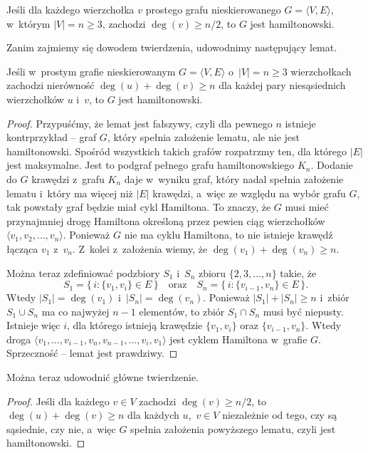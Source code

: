 \subproblem %
\begin{twierdzenie}[Dirac]
	Jeśli dla każdego wierzchołka $v$ prostego grafu nieskierowanego $G=\langle V,E\rangle$, w~którym $|V|=n\ge3$, zachodzi $\deg(v)\ge n/2$, to $G$ jest hamiltonowski.
\end{twierdzenie}
Zanim zajmiemy się dowodem twierdzenia, udowodnimy następujący lemat.
\begin{lemat}[Ore]
	Jeśli w~prostym grafie nieskierowanym $G=\langle V,E\rangle$ o~$|V|=n\ge3$ wierzchołkach zachodzi nierówność $\deg(u)+\deg(v)\ge n$ dla każdej pary niesąsiednich wierzchołków $u$ i~$v$, to $G$ jest hamiltonowski.
\end{lemat}
\begin{proof}
Przypuśćmy, że lemat jest fałszywy, czyli dla pewnego $n$ istnieje kontrprzykład -- graf $G$, który spełnia założenie lematu, ale nie jest hamiltonowski. Spośród wszystkich takich grafów rozpatrzmy ten, dla którego $|E|$ jest maksymalne. Jest to podgraf pełnego grafu hamiltonowskiego $K_n$. Dodanie do $G$ krawędzi z~grafu $K_n$ daje w~wyniku graf, który nadal spełnia założenie lematu i~który ma więcej niż $|E|$ krawędzi, a~więc ze względu na wybór grafu $G$, tak powstały graf będzie miał cykl Hamiltona. To znaczy, że $G$ musi mieć przynajmniej drogę Hamiltona określoną przez pewien ciąg wierzchołków $\langle v_1,v_2,\dots,v_n\rangle$. Ponieważ $G$ nie ma cyklu Hamiltona, to nie istnieje krawędź łącząca $v_1$ z~$v_n$. Z~kolei z~założenia wiemy, że $\deg(v_1)+\deg(v_n)\ge n$.

Można teraz zdefiniować podzbiory $S_1$ i~$S_n$ zbioru $\{2,3,\dots,n\}$ takie, że
\[
	S_1 = \bigl\{\,i:\{v_1,v_i\}\in E\,\bigr\} \quad\text{oraz}\quad S_n = \bigl\{\,i:\{v_{i-1},v_n\}\in E\,\bigr\}.
\]
Wtedy $|S_1|=\deg(v_1)$ i~$|S_n|=\deg(v_n)$. Ponieważ $|S_1|+|S_n|\ge n$ i~zbiór $S_1\cup S_n$ ma co najwyżej $n-1$ elementów, to zbiór $S_1\cap S_n$ musi być niepusty. Istnieje więc $i$, dla którego istnieją krawędzie $\{v_1,v_i\}$ oraz $\{v_{i-1},v_n\}$. Wtedy droga $\langle v_1,\dots,v_{i-1},v_n,v_{n-1},\dots,v_i,v_1\rangle$ jest cyklem Hamiltona w~grafie $G$. Sprzeczność -- lemat jest prawdziwy.
\end{proof}

Można teraz udowodnić główne twierdzenie.
\begin{proof}
Jeśli dla każdego $v\in V$ zachodzi $\deg(v)\ge n/2$, to $\deg(u)+\deg(v)\ge n$ dla każdych $u$,~$v\in V$ niezależnie od tego, czy są sąsiednie, czy nie, a~więc $G$ spełnia założenia powyższego lematu, czyli jest hamiltonowski.
\end{proof}

